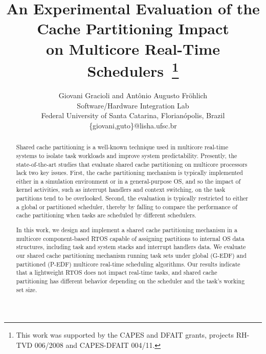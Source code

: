 \documentclass[10pt, conference, compsocconf]{IEEEtran}
\begin{document}
%
\title{An Experimental Evaluation of the Cache Partitioning Impact\\ on Multicore Real-Time Schedulers~\thanks{This work was supported by the CAPES and DFAIT grants, projects RH-TVD 006/2008 and CAPES-DFAIT 004/11.}}




\author{Giovani Gracioli and Ant\^{o}nio Augusto Fr\"{o}hlich\\
Software/Hardware Integration Lab \\
Federal University of Santa Catarina, Florian\'{o}polis, Brazil \\
\{giovani,guto\}@lisha.ufsc.br
}

\maketitle

\begin{abstract}
Shared cache partitioning is a well-known technique used in multicore real-time systems to isolate task workloads and improve system predictability. Presently, the state-of-the-art studies that evaluate shared cache partitioning on multicore processors lack two key issues. First, the cache partitioning mechanism is typically implemented either in a simulation environment or in a general-purpose OS, and so the impact of kernel activities, such as interrupt handlers and context switching, on the task partitions tend to be overlooked. Second, the evaluation is typically restricted to either a global or partitioned scheduler, thereby by falling to compare the performance of cache partitioning when tasks are scheduled by different schedulers.

In this work, we design and implement a shared cache partitioning mechanism in a multicore component-based RTOS capable of assigning partitions to internal OS data structures, including task and system stacks and interrupt handlers data. We evaluate our shared cache partitioning mechanism running task sets under global (G-EDF) and partitioned (P-EDF) multicore real-time scheduling algorithms. Our results indicate that a lightweight RTOS does not impact real-time tasks, and shared cache partitioning has different behavior depending on the scheduler and the task's working set size.

\end{abstract}
\end{document}
